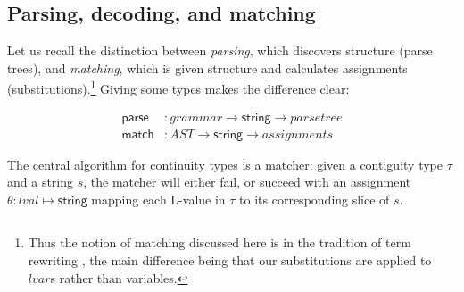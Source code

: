 \documentclass[svgnames]{llncs}
\newcommand{\konst}[1]{\ensuremath{\mathsf{#1}}}
\begin{document}
\subsection{Parsing, decoding, and matching}

Let us recall the distinction between \emph{parsing}, which discovers
structure (parse trees), and \emph{matching}, which is given structure
and calculates assignments (substitutions).\footnote{Thus the notion
  of matching discussed here is in the tradition of term rewriting
  \cite{nipkow-trs-book}, the main difference being that our
  substitutions are applied to $\mathit{lvar}$s rather than
  variables.} Giving some types makes the difference clear:

\begin{align*}
  \konst{parse} &: \mathit{grammar} \to \konst{string} \to \mathit{parse tree} \\
  \konst{match} &: \mathit{AST} \to \konst{string} \to \mathit{assignments}
\end{align*}

The central algorithm for continuity types is a matcher: given a
contiguity type $\tau$ and a string $s$, the matcher will either fail,
or succeed with an assignment $\theta : \mathit{lval} \mapsto
\konst{string}$ mapping each L-value in $\tau$ to its corresponding
slice of $s$.
\end{document}
